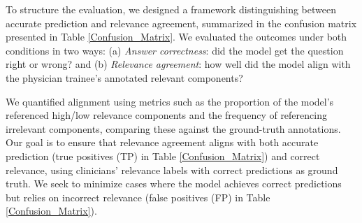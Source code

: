 \documentclass[11pt]{article}
\begin{document}

To structure the evaluation, we designed a framework distinguishing between accurate prediction and relevance agreement, summarized in the confusion matrix presented in Table \ref{Confusion_Matrix}. We evaluated the outcomes under both conditions in two ways: (a) \textit{Answer correctness}: did the model get the question right or wrong? and (b) \textit{Relevance agreement}: how well did the model align with the physician trainee’s annotated relevant components? 

We quantified alignment using metrics such as the proportion of the model’s referenced high/low relevance components and the frequency of referencing irrelevant components, comparing these against the ground-truth annotations. Our goal is to ensure that relevance agreement aligns with both accurate prediction (true positives (TP) in Table \ref{Confusion_Matrix}) and correct relevance, using clinicians' relevance labels with correct predictions as ground truth. We seek to minimize cases where the model achieves correct predictions but relies on incorrect relevance (false positives (FP) in Table \ref{Confusion_Matrix}).
\end{document}
